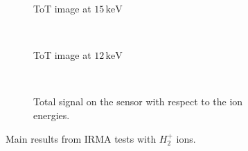 \begin{figure}[!ht]
	\begin{subfigure}{0.25\textwidth}
		
		\caption{ToT image at $15\,\mathrm{keV}$}
		\label{}
	\end{subfigure}
	~
	\begin{subfigure}{0.25\textwidth}
		
		\caption{ToT image at $12\,\mathrm{keV}$}
		\label{}
  \end{subfigure}
  ~
  \begin{subfigure}{0.5\textwidth}
		
		\caption{Total signal on the sensor with respect to the ion energies.}
		\label{}
  \end{subfigure}
	\caption[Main results from IRMA tests with $H_{2}^{+}$ ions]{Main results from IRMA tests with $H_{2}^{+}$ ions.}
	\label{chap4:IRMA_Si}
\end{figure}
